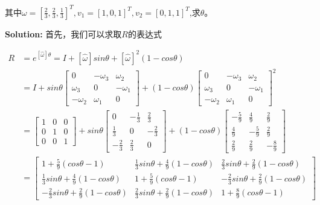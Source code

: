 \documentclass{ctexart}
\begin{document}
其中$\omega = [\frac{2}{3},\frac{2}{3},\frac{1}{3}]^T,v_1=[1,0,1]^T,v_2=[0 ,1 ,1]^T$,求$\theta$。

\textbf{Solution:}
首先，我们可以求取$R$的表达式

\begin{equation*}
	\begin{aligned}
		R &= e^{[\hat{\omega}] \theta} = I + [\hat{\omega}]sin\theta + [\hat{\omega}]^2(1-cos\theta)\\
		&= I + sin \theta \begin{bmatrix}
			0 & -\omega_3 & \omega_2 \\
			\omega_3 & 0 & -\omega_1 \\
			-\omega_2 & \omega_1 & 0
		\end{bmatrix} + (1-cos\theta)  \begin{bmatrix}
			0 & -\omega_3 & \omega_2 \\
			\omega_3 & 0 & -\omega_1 \\
			-\omega_2 & \omega_1 & 0
		\end{bmatrix}^2\\
		&= \begin{bmatrix}
			1 & 0 & 0 \\
			0 & 1 & 0 \\
			0 & 0 & 1
		\end{bmatrix} + sin\theta \begin{bmatrix}
			0 & -\frac{1}{3} & \frac{2}{3} \\
			\frac{1}{3} & 0 & -\frac{2}{3} \\
			-\frac{2}{3} & \frac{2}{3} & 0
		\end{bmatrix} + (1-cos\theta) \begin{bmatrix}
			-\frac{5}{9} &  \frac{4}{9} &  \frac{2}{9} \\
			\frac{4}{9} &  -\frac{5}{9} &  \frac{2}{9} \\
			\frac{2}{9} &  \frac{2}{9} &  -\frac{8}{9}
		\end{bmatrix}\\
		&= \begin{bmatrix}
			1+\frac{5}{9}(cos\theta -1) & \frac{1}{3}sin\theta + \frac{4}{9}(1-cos\theta) & \frac{2}{3}sin\theta + \frac{2}{9}(1-cos\theta) \\
			\frac{1}{3}sin\theta + \frac{4}{9}(1-cos\theta) & 1+\frac{5}{9}(cos\theta -1) & -\frac{2}{3}sin\theta + \frac{2}{9}(1-cos\theta) \\
			-\frac{2}{3}sin\theta + \frac{2}{9}(1-cos\theta) & \frac{2}{3}sin\theta + \frac{2}{9}(1-cos\theta) & 1+\frac{8}{9}(cos\theta -1)
		\end{bmatrix}
	\end{aligned}
\end{equation*}
\end{document}
